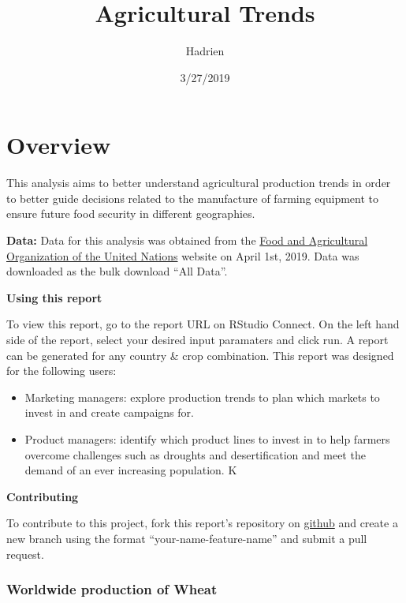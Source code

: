 \documentclass[]{article}
\title{Agricultural Trends}
\author{Hadrien}
\date{3/27/2019}
\providecommand{\tightlist}{%
  \setlength{\itemsep}{0pt}\setlength{\parskip}{0pt}}
\begin{document}
\maketitle

\hypertarget{overview}{%
\section{Overview}\label{overview}}

This analysis aims to better understand agricultural production trends
in order to better guide decisions related to the manufacture of farming
equipment to ensure future food security in different geographies.

\textbf{Data:} Data for this analysis was obtained from the
\href{http://www.fao.org/faostat/en/\#data/QC}{Food and Agricultural
Organization of the United Nations} website on April 1st, 2019. Data was
downloaded as the bulk download ``All Data''.

\textbf{Using this report}

To view this report, go to the report URL on RStudio Connect. On the
left hand side of the report, select your desired input paramaters and
click run. A report can be generated for any country \& crop
combination. This report was designed for the following users:

\begin{itemize}
\tightlist
\item
  Marketing managers: explore production trends to plan which markets to
  invest in and create campaigns for.
\item
  Product managers: identify which product lines to invest in to help
  farmers overcome challenges such as droughts and desertification and
  meet the demand of an ever increasing population. K
\end{itemize}

\textbf{Contributing}

To contribute to this project, fork this report's repository on
\href{https://github.com/hdykiel/paramaterized-report-agriculture/commits/master}{github}
and create a new branch using the format ``your-name-feature-name'' and
submit a pull request.

\hypertarget{worldwide-production-of-wheat}{%
\subsubsection{Worldwide production of
Wheat}\label{worldwide-production-of-wheat}}
\end{document}
